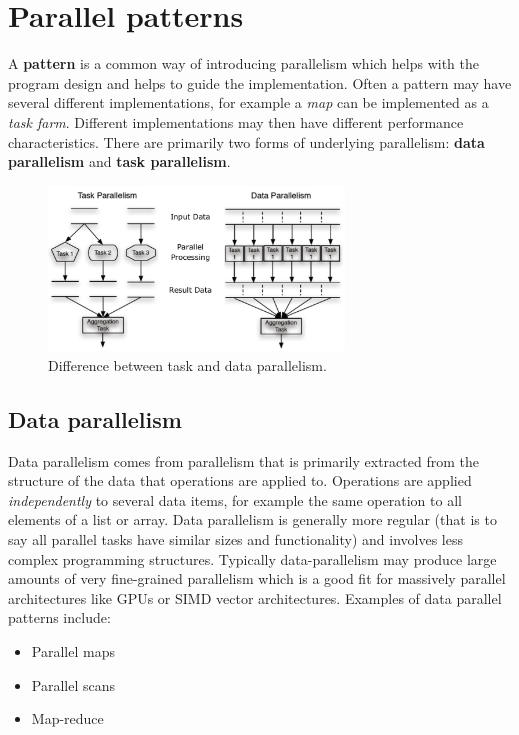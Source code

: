 \documentclass[CS4204-Notes.tex]{subfiles}
\begin{document}
\section{Parallel patterns}
A \textbf{pattern} is a common way of introducing parallelism which helps with the program design and helps to guide the implementation. Often a pattern may have several different implementations, for example a \textit{map} can be implemented as a \textit{task farm}. Different implementations may then have different performance characteristics. There are primarily two forms of underlying parallelism: \textbf{data parallelism} and \textbf{task parallelism}.
\begin{figure}[H]
\centering
\includegraphics[width=0.7\textwidth, keepaspectratio]{imgs/task-data-parallelism.png}
\caption{Difference between task and data parallelism.}
\end{figure}

\subsection{Data parallelism}
Data parallelism comes from parallelism that is primarily extracted from the structure of the data that operations are applied to. Operations are applied \textit{independently} to several data items, for example the same operation to all elements of a list or array. Data parallelism is generally more regular (that is to say all parallel tasks have similar sizes and functionality) and involves less complex programming structures. Typically data-parallelism may produce large amounts of very fine-grained parallelism which is a good fit for massively parallel architectures like GPUs or SIMD vector architectures. 
\n
Examples of data parallel patterns include:
\begin{itemize}
\item Parallel maps
\item Parallel scans
\item Map-reduce
\end{itemize}
\end{document}
